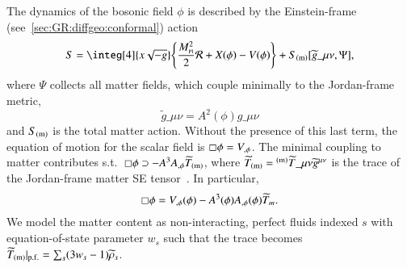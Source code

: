     The dynamics of the bosonic field $\phi$ is described by the Einstein-frame (see~\cref{sec:GR:diffgeo:conformal}) action%
    \begin{equation}\label{eq:cosmo:quintessence:quintessence_action_Einstein}
        S =\integ[4]{x\sqrt{-g}} \cclosed{ \frac{M\nped{Pl}^2}{2} \mathcal{R} + X(\phi) - V(\phi)} + S\ped{(m)}[\widetilde{g}\_{\mu\nu} , \Psi],
    \end{equation} 
    where $\Psi$ collects all matter fields, which couple minimally to the Jordan-frame metric,
    \begin{equation}
        \widetilde{g}\_{\mu\nu} = A^2 (\phi) g\_{\mu\nu}%
    \end{equation}
    and $S_\mathrm{(m)}$ is the total matter action. 
    Without the presence of this last term, the equation of motion for the scalar field is $\sq \phi = V_{,\phi}$. %
    The minimal coupling to matter contributes s.t.~$\sq\phi \supset - A^{3} A_{,\phi}\widetilde{T}\ped{(m)}$, where $\widetilde{T}\ped{(m)}= {}\ap{(m)}\widetilde{T}\_{\mu\nu}\widetilde{g}\^{\mu\nu}$ is the trace of the Jordan-frame matter SE tensor~\citep{hinterbichlerSymmetronCosmology2011,christiansenAsevolutionRelativisticNbody2023}. In particular, 
    \begin{equation}
        \sq\phi = V_{,\phi}(\phi) - A^{3}(\phi) A_{,\phi}(\phi)\widetilde{T}_m.%
    \end{equation}
    We model the matter content as non-interacting, perfect fluids indexed $s$ with equation-of-state parameter $w_s$ such that the trace becomes $\widetilde{T}_\mathrm{(m)}\rvert_\mathrm{p.f.} = \sum_s (3w_s-1 )\widetilde{\rho}_s$.  
